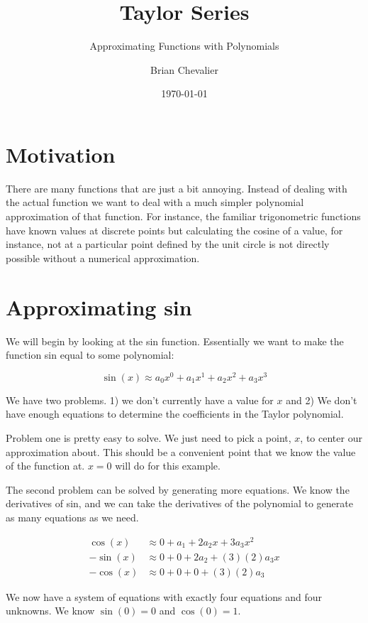 \documentclass{../../KDHnotes}
\title{Taylor Series}
\subtitle{Approximating Functions with Polynomials}
\author{Brian Chevalier}
\date{\today}
\begin{document}
 
\maketitle
\section{Motivation}

There are many functions that are just a bit annoying. Instead of dealing with the actual function we want to deal with a much simpler polynomial approximation of that function. For instance, the familiar trigonometric functions have known values at discrete points but calculating the cosine of a value, for instance, not at a particular point defined by the unit circle is not directly possible without a numerical approximation. 

\section{Approximating sin}
We will begin by looking at the sin function. Essentially we want to make the function sin equal to some polynomial:

\begin{equation}
  \sin(x)\approx a_0 x^0 + a_1x^1+a_2x^2 + a_3x^3
  \label{Eq:sin}
\end{equation}

We have two problems. 1) we don't currently have a value for $x$ and 2) We don't have enough equations to determine the coefficients in the Taylor polynomial.

Problem one is pretty easy to solve. We just need to pick a point, $x$, to center our approximation about. This should be a convenient point that we know the value of the function at. $x=0$ will do for this example.

The second problem can be solved by generating more equations. We know the derivatives of sin, and we can take the derivatives of the polynomial to generate as many equations as we need.

\begin{align}
  \cos(x)  &\approx 0   +a_1  +2a_2x  +3a_3x^2\\
  -\sin(x) &\approx 0   +0    +2a_2   +(3)(2)a_3x\\
  -\cos(x) &\approx 0   +0    +0      +(3)(2)a_3
\end{align}

We now have a system of equations with exactly four equations and four unknowns. We know $\sin(0)=0$ and $\cos(0)=1$.
\end{document}

